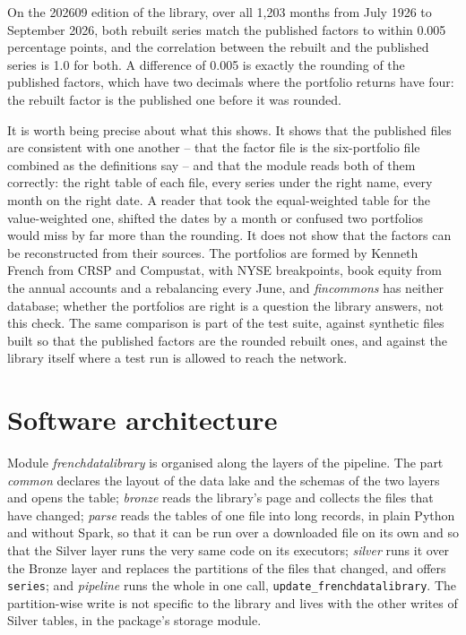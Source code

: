 On the 202609 edition of the library, over all 1{,}203 months from July 1926 to September 2026, both rebuilt series match the published factors to within 0.005 percentage points, and the correlation between the rebuilt and the published series is 1.0 for both. A difference of 0.005 is exactly the rounding of the published factors, which have two decimals where the portfolio returns have four: the rebuilt factor is the published one before it was rounded.

It is worth being precise about what this shows. It shows that the published files are consistent with one another -- that the factor file is the six-portfolio file combined as the definitions say -- and that the module reads both of them correctly: the right table of each file, every series under the right name, every month on the right date. A reader that took the equal-weighted table for the value-weighted one, shifted the dates by a month or confused two portfolios would miss by far more than the rounding. It does not show that the factors can be reconstructed from their sources. The portfolios are formed by Kenneth French from CRSP and Compustat, with NYSE breakpoints, book equity from the annual accounts and a rebalancing every June, and \emph{fincommons} has neither database; whether the portfolios are right is a question the library answers, not this check. The same comparison is part of the test suite, against synthetic files built so that the published factors are the rounded rebuilt ones, and against the library itself where a test run is allowed to reach the network.

\section{Software architecture}

Module \emph{frenchdatalibrary} is organised along the layers of the pipeline. The part \emph{common} declares the layout of the data lake and the schemas of the two layers and opens the table; \emph{bronze} reads the library's page and collects the files that have changed; \emph{parse} reads the tables of one file into long records, in plain Python and without Spark, so that it can be run over a downloaded file on its own and so that the Silver layer runs the very same code on its executors; \emph{silver} runs it over the Bronze layer and replaces the partitions of the files that changed, and offers \verb|series|; and \emph{pipeline} runs the whole in one call, \verb|update_frenchdatalibrary|. The partition-wise write is not specific to the library and lives with the other writes of Silver tables, in the package's storage module.

